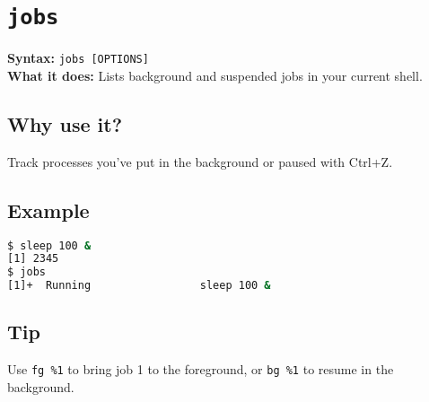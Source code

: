 \documentclass[10pt,oneside]{scrbook}
\begin{document}
\section{\texttt{jobs}}
\begin{cmdbox}
  \textbf{Syntax:} \lstinline!jobs [OPTIONS]! \\
  \textbf{What it does:} Lists background and suspended jobs in your current shell.
\end{cmdbox}
\begin{commanddetails}
  \subsection*{Why use it?}
    Track processes you’ve put in the background or paused with Ctrl+Z.

  \subsection*{Example}
  \begin{lstlisting}[language=bash]
$ sleep 100 &
[1] 2345
$ jobs
[1]+  Running                 sleep 100 &
  \end{lstlisting}

  \subsection*{Tip}
    Use \lstinline!fg %1! to bring job 1 to the foreground, or \lstinline!bg %1! to resume in the background.
\end{commanddetails}

\end{document}
